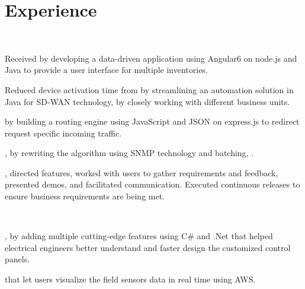 \documentclass[]{rinkal_resume}
\begin{document}
\begin{minipage}[t]{0.69\textwidth} 


\section{Experience}

\hfill\   
\vspace{\topsep} %
\begin{tightemize}
\item Received  by developing a data-driven application using Angular6 on node.js and Java to provide a user interface for multiple inventories. 
\item Reduced device activation time from  by streamlining an automation solution in Java for SD-WAN technology, by closely working with different business units.
\item {} by building a routing engine using JavaScript and JSON on express.js to redirect request specific incoming traffic.
\item {}, by rewriting the algorithm using SNMP technology and batching, .
\item {}, directed features, worked with users to gather requirements and feedback, presented demos, and facilitated communication. Executed continuous releases to ensure business requirements are being met.
\end{tightemize}
\smallsectionsep

 \\
\begin{tightemize}
\item {}, by adding multiple cutting-edge features using C\# and .Net that helped electrical engineers better understand and faster design the customized control panels.
\item {} that let users visualize the field sensors data in real time using AWS.
\end{tightemize}
\smallsectionsep


\end{minipage}
\end{document}
